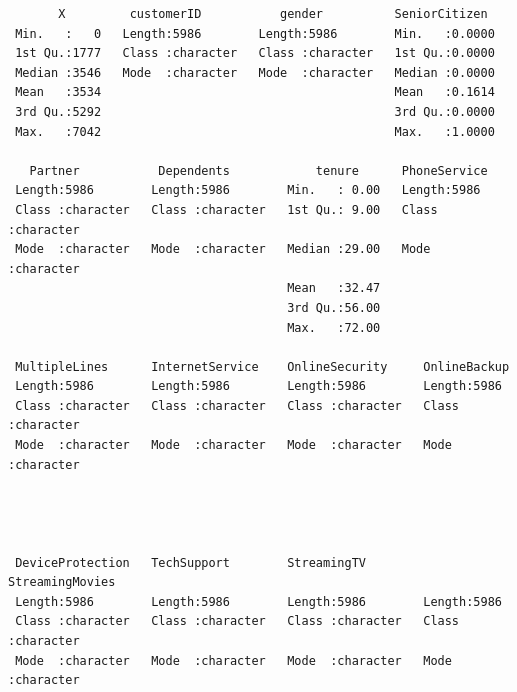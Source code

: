\documentclass[
  letterpaper,
  DIV=11,
  numbers=noendperiod]{scrreprt}
\begin{document}
\begin{verbatim}
       X         customerID           gender          SeniorCitizen   
 Min.   :   0   Length:5986        Length:5986        Min.   :0.0000  
 1st Qu.:1777   Class :character   Class :character   1st Qu.:0.0000  
 Median :3546   Mode  :character   Mode  :character   Median :0.0000  
 Mean   :3534                                         Mean   :0.1614  
 3rd Qu.:5292                                         3rd Qu.:0.0000  
 Max.   :7042                                         Max.   :1.0000  
                                                                      
   Partner           Dependents            tenure      PhoneService      
 Length:5986        Length:5986        Min.   : 0.00   Length:5986       
 Class :character   Class :character   1st Qu.: 9.00   Class :character  
 Mode  :character   Mode  :character   Median :29.00   Mode  :character  
                                       Mean   :32.47                     
                                       3rd Qu.:56.00                     
                                       Max.   :72.00                     
                                                                         
 MultipleLines      InternetService    OnlineSecurity     OnlineBackup      
 Length:5986        Length:5986        Length:5986        Length:5986       
 Class :character   Class :character   Class :character   Class :character  
 Mode  :character   Mode  :character   Mode  :character   Mode  :character  
                                                                            
                                                                            
                                                                            
                                                                            
 DeviceProtection   TechSupport        StreamingTV        StreamingMovies   
 Length:5986        Length:5986        Length:5986        Length:5986       
 Class :character   Class :character   Class :character   Class :character  
 Mode  :character   Mode  :character   Mode  :character   Mode  :character  
                                                                            
                                                                            
                                                                            

\end{verbatim}
\end{document}
